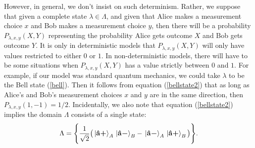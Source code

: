 However, in general, we don't insist on such determinism. Rather, we suppose that given a complete state $\lambda\in\Lambda$, and given that Alice makes a measurement choice $x$ and Bob makes a measurement choice $y$, then there will be a probability $P_{\lambda,x,y}(X , Y)$ representing the probability Alice gets outcome $X$ and Bob gets outcome $Y$. It is only in deterministic models that $P_{\lambda,x,y}(X , Y)$ will only have values restricted to either $0$ or $1$. In non-deterministic models, there will have to be some situations when $P_{\lambda,x,y}(X, Y)$ has a value strictly between $0$ and $1$. For example, if our model was standard quantum mechanics, we could take $\lambda$ to be the Bell state (\ref{bell}). Then it follows from equation (\ref{bellstate2}) that as long as Alice's and Bob's measurement choices $x$ and $y$ are in the same direction, then $P_{\lambda,x,y}(1,-1)=1/2$. Incidentally, we also note that equation (\ref{bellstate2}) implies the domain $\Lambda$ consists of a single state:
\begin{equation}\label{quantumLambda}
\Lambda=\Bigg\{\frac{1}{\sqrt{2}}\big(\ket*{\vb{\hat{{a}}}\bm{+}}_A\ket*{\vb{\hat{{a}}}\bm{-}}_B-\ket*{\vb{\hat{{a}}}\bm{-}}_A\ket*{\vb{\hat{{a}}}\bm{+}}_B\big)\Bigg\}.
\end{equation}

